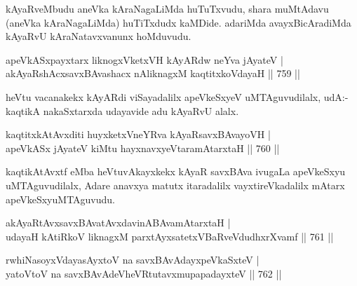 \begin{artha}
kAyaRveMbudu aneVka kAraNagaLiMda huTuTxvudu, shara muMtAdavu (aneVka kAraNagaLiMda) huTiTxdudx kaMDide. adariMda avayxBicAradiMda kAyaRvU kAraNatavxvanunx hoMduvudu.
\end{artha}


\begin{shl}
apeVkASx\s payxtarx liknogxVketxVH kAyARdw neYva jAyateV | \\
akAyaRshAcxsavxBAvashacx nAliknagxM \footnotemark[1]kaqtitxkoVdayaH \hfill||  759 ||  
\end{shl}

\begin{artha}
heVtu vacanakekx kAyARdi viSayadalilx apeVkeSxyeV uMTAguvudilalx, udA:-kaqtikA nakaSxtarxda udayavide adu kAyaRvU alalx.
\end{artha}


\begin{shl}
kaqtitxkAtAvxditi huyxketxVneYRva kAyaRsavxBAvayoVH | \\
apeVkASx jAyateV kiMtu hayxnavxyeVtaramAtarxtaH \hfill||  760 ||  
\end{shl}

\begin{artha}
kaqtikAtAvxtf eMba heVtuvAkayxkekx kAyaR savxBAva ivugaLa apeVkeSxyu uMTAguvudilalx, Adare anavxya matutx itaradalilx vayxtireVkadalilx mAtarx apeVkeSxyuMTAguvudu.
\end{artha}


\begin{shl}
akAyaRtAvxsavxBAvatAvxdavinABAvamAtarxtaH | \\
udayaH kAtiRkoV liknagxM parxtAyxsatetxVBaRveVdudhxrXvamf \hfill||  761 ||  
\end{shl}
				
\begin{shl}
rwhiNasoyxVdayasAyxtoV na savxBAvAdayxpeVkaSxteV | \\
yatoV\s toV na savxBAvAdeVheVRtutavxmupapadayxteV \hfill||  762 ||  
\end{shl}

